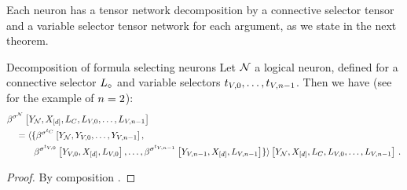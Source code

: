 Each neuron has a tensor network decomposition by a connective selector tensor and a variable selector tensor network for each argument, as we state in the next theorem.

\begin{theorem}{Decomposition of formula selecting neurons}
    \label{the:neuronDecomposition}
    Let $\mathcal{N}$ a logical neuron, defined for a connective selector $L_{\circ}$ and variable selectors $t_{V,0},\ldots,t_{V,n-1}$.
    Then we have (see  for the example of $n=2$):
    \begin{align*}
        &\bsencodingofat{\lneuron}{\headvariableof{\lneuron},\shortcatvariables,\selvariableof{\cselectionsymbol},\selvariableof{\vselectionsymbol,0},\ldots,\selvariableof{\vselectionsymbol,\selorder-1}} \\
        &\quad = \langle\{\bsencodingofat{\cselectionmap}{
            \headvariableof{\lneuron},\headvariableof{\vselectionsymbol,0},\ldots,\headvariableof{\vselectionsymbol,\selorder-1}}, \\
        & \quad\quad\quad\bsencodingofat{\vselectionmapof{0}}{
            \headvariableof{\vselectionsymbol,0},\shortcatvariables,\selvariableof{\vselectionsymbol,0}},\ldots,
        \bsencodingofat{\vselectionmapof{\selorder-1}}{
            \headvariableof{\vselectionsymbol,\selorder-1},\shortcatvariables,\selvariableof{\vselectionsymbol,\selorder-1}}
        \} \rangle
        \left[\headvariableof{\lneuron},\shortcatvariables, \selvariableof{\cselectionsymbol},\selvariableof{\vselectionsymbol,0},\ldots,\selvariableof{\vselectionsymbol,\selorder-1}\right] \, .
    \end{align*}
\end{theorem}
\begin{proof}
    By composition .
\end{proof}



